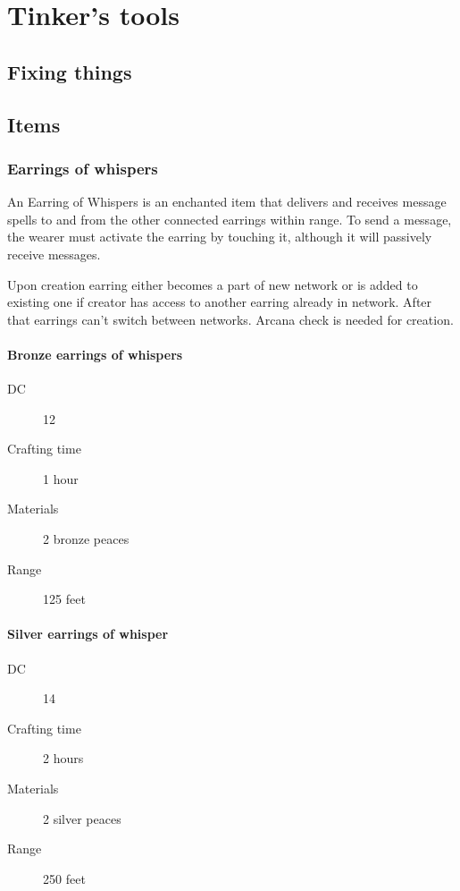 \chapter{Tinker's tools}

\section{Fixing things}

\section{Items}

\subsection{Earrings of whispers}

An Earring of Whispers is an enchanted item that delivers and receives message spells to and from the other connected earrings within range. To send a message, the wearer must activate the earring by touching it, although it will passively receive messages.

Upon creation earring either becomes a part of new network or is added to existing one if creator has access to another earring already in network. After that earrings can't switch between networks. Arcana check is needed for creation.

\subsubsection{Bronze earrings of whispers}

\begin{description}
\item [DC] 12
\item [Crafting time] 1 hour
\item [Materials] 2 bronze peaces
\item [Range] 125 feet
\end{description}

\subsubsection{Silver earrings of whisper}

\begin{description}
\item [DC] 14
\item [Crafting time] 2 hours
\item [Materials] 2 silver peaces
\item [Range] 250 feet
\end{description}

